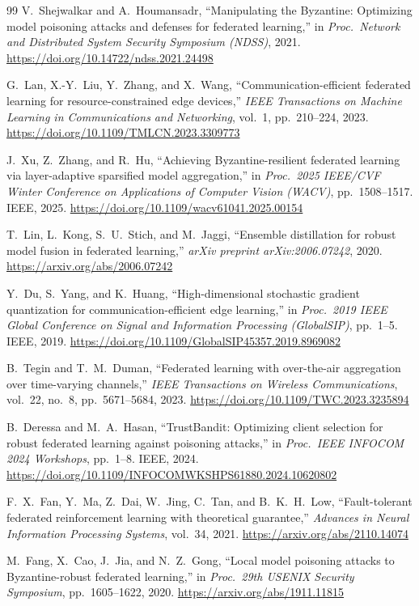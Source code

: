 \documentclass[12pt,a4paper]{article}
\begin{document}
\begin{thebibliography}{99}
V.~Shejwalkar and A.~Houmansadr,
``Manipulating the Byzantine: Optimizing model poisoning attacks and defenses for
federated learning,''
in \textit{Proc.\ Network and Distributed System Security Symposium (NDSS)}, 2021.
\url{https://doi.org/10.14722/ndss.2021.24498}

G.~Lan, X.-Y.~Liu, Y.~Zhang, and X.~Wang,
``Communication-efficient federated learning for resource-constrained edge devices,''
\textit{IEEE Transactions on Machine Learning in Communications and Networking},
vol.~1, pp.~210--224, 2023.
\url{https://doi.org/10.1109/TMLCN.2023.3309773}

J.~Xu, Z.~Zhang, and R.~Hu,
``Achieving Byzantine-resilient federated learning via layer-adaptive sparsified model
aggregation,''
in \textit{Proc.\ 2025 IEEE/CVF Winter Conference on Applications of Computer Vision
(WACV)}, pp.~1508--1517. IEEE, 2025.
\url{https://doi.org/10.1109/wacv61041.2025.00154}

T.~Lin, L.~Kong, S.~U.~Stich, and M.~Jaggi,
``Ensemble distillation for robust model fusion in federated learning,''
\textit{arXiv preprint arXiv:2006.07242}, 2020.
\url{https://arxiv.org/abs/2006.07242}

Y.~Du, S.~Yang, and K.~Huang,
``High-dimensional stochastic gradient quantization for communication-efficient edge
learning,''
in \textit{Proc.\ 2019 IEEE Global Conference on Signal and Information Processing
(GlobalSIP)}, pp.~1--5. IEEE, 2019.
\url{https://doi.org/10.1109/GlobalSIP45357.2019.8969082}

B.~Tegin and T.~M.~Duman,
``Federated learning with over-the-air aggregation over time-varying channels,''
\textit{IEEE Transactions on Wireless Communications}, vol.~22, no.~8,
pp.~5671--5684, 2023.
\url{https://doi.org/10.1109/TWC.2023.3235894}

B.~Deressa and M.~A.~Hasan,
``TrustBandit: Optimizing client selection for robust federated learning against
poisoning attacks,''
in \textit{Proc.\ IEEE INFOCOM 2024 Workshops}, pp.~1--8. IEEE, 2024.
\url{https://doi.org/10.1109/INFOCOMWKSHPS61880.2024.10620802}

F.~X.~Fan, Y.~Ma, Z.~Dai, W.~Jing, C.~Tan, and B.~K.~H.~Low,
``Fault-tolerant federated reinforcement learning with theoretical guarantee,''
\textit{Advances in Neural Information Processing Systems}, vol.~34, 2021.
\url{https://arxiv.org/abs/2110.14074}

M.~Fang, X.~Cao, J.~Jia, and N.~Z.~Gong,
``Local model poisoning attacks to Byzantine-robust federated learning,''
in \textit{Proc.\ 29th USENIX Security Symposium}, pp.~1605--1622, 2020.
\url{https://arxiv.org/abs/1911.11815}


\end{thebibliography}
\end{document}
